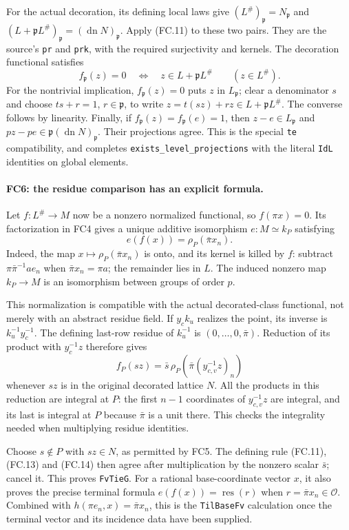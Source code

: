 For the actual decoration, its defining local laws give
$(L^\#)_{\mathfrak p}=N_{\mathfrak p}$ and
$(L+\mathfrak pL^\#)_{\mathfrak p}=(\operatorname{dn}N)_{\mathfrak p}$.
Apply (FC.11) to these two pairs. They are the source's
\texttt{pr} and \texttt{prk}, with the required surjectivity and kernels.
The decoration functional satisfies
\[
 f_{\mathfrak p}(z)=0\quad\Longleftrightarrow\quad
 z\in L+\mathfrak pL^\#\qquad(z\in L^\#).              \tag{FC.12}
\]
For the nontrivial implication, $f_{\mathfrak p}(z)=0$ puts $z$ in
$L_{\mathfrak p}$; clear a denominator $s$ and choose
$ts+r=1$, $r\in\mathfrak p$, to write
$z=t(sz)+rz\in L+\mathfrak pL^\#$. The converse follows by
linearity. Finally, if $f_{\mathfrak p}(z)=f_{\mathfrak p}(e)=1$,
then $z-e\in L_{\mathfrak p}$ and
$pz-pe\in\mathfrak p(\operatorname{dn}N)_{\mathfrak p}$.
Their projections agree. This is the special \texttt{te} compatibility,
and completes \texttt{exists\_level\_projections} with the literal
\texttt{IdL} identities on global elements.

\paragraph{FC6: the residue comparison has an explicit formula.}
Let $f:L^\#\to M$ now be a nonzero normalized functional, so
$f(\pi x)=0$. Its factorization in FC4 gives a unique additive
isomorphism $e:M\simeq k_P$ satisfying
\[
 e(f(x))=\rho_P(\bar\pi x_n).                          \tag{FC.13}
\]
Indeed, the map $x\mapsto\rho_P(\bar\pi x_n)$ is onto, and its
kernel is killed by $f$: subtract
$\pi\bar\pi^{-1}ae_n$ when $\bar\pi x_n=\pi a$; the
remainder lies in $L$. The induced nonzero map $k_P\to M$ is an
isomorphism between groups of order $p$.

This normalization is compatible with the actual decorated-class
functional, not merely with an abstract residue field. If $y_ck_u$
realizes the point, its inverse is $k_u^{-1}y_c^{-1}$. The defining
last-row residue of $k_u^{-1}$ is
$(0,\ldots,0,\bar\pi)$. Reduction of its product with
$y_c^{-1}z$ therefore gives
\[
 f_P(sz)=\bar s\,\rho_P\!\left(
        \bar\pi (y_{c,v}^{-1}z)_n\right)               \tag{FC.14}
\]
whenever $sz$ is in the original decorated lattice $N$.
All the products in this reduction are integral at $P$: the first
$n-1$ coordinates of $y_{c,v}^{-1}z$ are integral, and its last is
integral at $P$ because $\bar\pi$ is a unit there. This checks the
integrality needed when multiplying residue identities.

Choose $s\notin P$ with $sz\in N$, as permitted by FC5.
The defining rule (FC.11), (FC.13) and (FC.14) then agree after
multiplication by the nonzero scalar $\bar s$; cancel it.
This proves \texttt{FvTieG}. For a rational base-coordinate vector
$x$, it also proves the precise terminal formula
$e(f(x))=\operatorname{res}(r)$ when $r=\bar\pi x_n\in\mathcal O$.
Combined with $h(\pi e_n,x)=\bar\pi x_n$, this is the
\texttt{TilBaseFv} calculation once the terminal vector and its
incidence data have been supplied.

